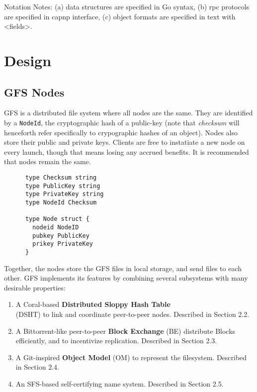 \documentclass{sig-alternate}
\begin{document}
Notation Notes:
(a) data structures are specified in Go syntax,
(b) rpc protocols are specified in capnp interface,
(c) object formats are specified in text with <fields>.



\section{Design}

\subsection{GFS Nodes}

GFS is a distributed file system where all nodes are the same. They are
identified by a \texttt{NodeId}, the cryptographic hash of a public-key
(note that \textit{checksum} will henceforth refer specifically to crypographic
hashes of an object). Nodes also store their public and private keys. Clients
are free to instatiate a new node on every launch, though that means losing any
accrued benefits. It is recommended that nodes remain the same.

\begin{verbatim}
      type Checksum string
      type PublicKey string
      type PrivateKey string
      type NodeId Checksum

      type Node struct {
        nodeid NodeID
        pubkey PublicKey
        prikey PrivateKey
      }
\end{verbatim}


Together, the
nodes store the GFS files in local storage, and send files to each other.
GFS implements its features by combining several subsystems with many
desirable properties:

\begin{enumerate}
  \item A Coral-based \textbf{Distributed Sloppy Hash Table}\\
        (DSHT) to link and coordinate peer-to-peer nodes.
        Described in Section 2.2.
  \item A Bittorrent-like peer-to-peer \textbf{Block Exchange} (BE) distribute
        Blocks efficiently, and to incentivize replication.
        Described in Section 2.3.
  \item A Git-inspired \textbf{Object Model} (OM) to represent the filesystem.
        Described in Section 2.4.
  \item An SFS-based self-certifying name system.
        Described in Section 2.5.
\end{enumerate}
\end{document}
